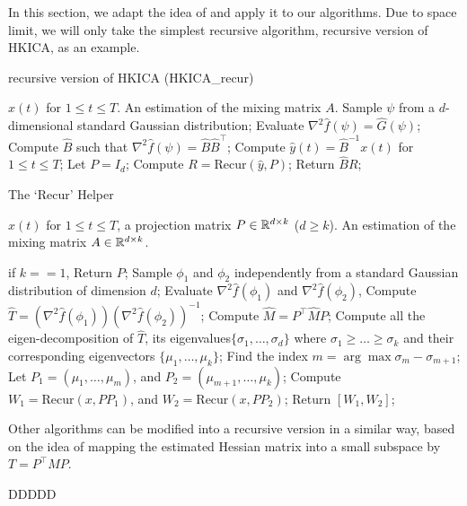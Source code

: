In this section, we adapt the idea of \citet{vempala2014max} and apply it to our algorithms. Due to space limit, we will only take the simplest recursive algorithm, recursive version of HKICA, as an example.
\begin{algorithm} 
\caption{recursive version of HKICA (HKICA\_recur)}
\label{alg:HKICA_recur}
\begin{algorithmic}[1]
\INPUT $x(t)$ for $1\le t \le T$. 
\OUTPUT An estimation of the mixing matrix $A$. 
\STATE Sample $\psi$ from a $d$-dimensional standard Gaussian distribution;
\STATE Evaluate $\nabla^2\hat{f}(\psi) = \hat{G}(\psi)$; \\
\STATE Compute $\hat{B}$ such that $\nabla^2\hat{f}(\psi) = \hat{B}\hat{B}^{\top}$;
\STATE Compute $\hat{y}(t) = \hat{B}^{-1}x(t)$ for $1\le t \le T$;
\STATE Let $P = I_d$;
\STATE Compute $R = \text{Recur}(\hat{y}, P)$;
\STATE Return $\hat{B}R$;
\end{algorithmic}
\end{algorithm}
\begin{algorithm} 
\caption{The `Recur' Helper}
\label{alg:recur}
\begin{algorithmic}[1]
\INPUT $x(t)$ for $1\le t \le T$, a projection matrix $P\in \mathbb{R}^{d\times k}$ ($d\ge k$). 
\OUTPUT An estimation of the mixing matrix $A\in \mathbb{R}^{d\times k}$. 

\STATE if $k==1$, Return $P$;
\STATE Sample $\phi_1$ and $\phi_2$ independently from a standard Gaussian distribution of dimension $d$;
\STATE Evaluate $\nabla^2\hat{f}(\phi_1)$ and $\nabla^2\hat{f}(\phi_2)$, 
\STATE Compute $\hat{T} = (\nabla^2 \hat{f}(\phi_1))(\nabla^2\hat{f}(\phi_2))^{-1}$;
\STATE Compute $\hat{M} = P^{\top} \hat{M} P$;
\STATE Compute all the eigen-decomposition of $\hat{T}$, its eigenvalues$\{\sigma_1,\ldots,\sigma_d\}$ where $\sigma_1\ge\ldots\ge \sigma_k$ and their corresponding eigenvectors $\{\mu_1,\ldots, \mu_k\}$;
\STATE Find the index $m = \arg\max \sigma_m - \sigma_{m+1}$; 
\STATE Let $P_1 = (\mu_1,\ldots,\mu_m)$, and $P_2 = (\mu_{m+1},\ldots,\mu_k)$;
\STATE Compute $W_1 = \text{Recur} (x, PP_1)$, and  $W_2 = \text{Recur} (x, PP_2)$;
\STATE Return $[W_1,W_2]$;
\end{algorithmic}
\end{algorithm}

\begin{remark}
Other algorithms can be modified into a recursive version in a similar way, based on the idea of mapping the estimated Hessian matrix into a small subspace by $T = P^{\top}MP$. 
\end{remark}
\begin{thm}
\label{thm:recursiveAlg}
DDDDD
\end{thm} 